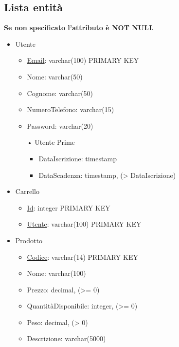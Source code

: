 \documentclass[11pt]{article}
\begin{document}
\subsection{Lista entità}

\textbf{Se non specificato l'attributo è NOT NULL}
\begin{itemize}
    \item Utente
    \begin{itemize}
        \item \underline{Email}: varchar(100) PRIMARY KEY
        \item Nome: varchar(50)
        \item Cognome: varchar(50)
        \item NumeroTelefono: varchar(15)
        \item Password: varchar(20)
        \item[•] Utente Prime
        \begin{itemize}
            \item DataIscrizione: timestamp
            \item DataScadenza: timestamp, (\textgreater{} DataIscrizione)
        \end{itemize}
    \end{itemize}
    \item Carrello
    \begin{itemize}
        \item \underline{Id}: integer PRIMARY KEY
        \item \underline{Utente}: varchar(100) PRIMARY KEY
    \end{itemize}
    \item Prodotto
    \begin{itemize}
        \item \underline{Codice}: varchar(14) PRIMARY KEY
        \item Nome: varchar(100)
        \item Prezzo: decimal, (\textgreater{}= 0)
        \item QuantitàDisponibile: integer, (\textgreater{}= 0)
        \item Peso: decimal, (\textgreater{} 0)
        \item Descrizione: varchar(5000)

\end{itemize}
\end{itemize}
\end{document}
